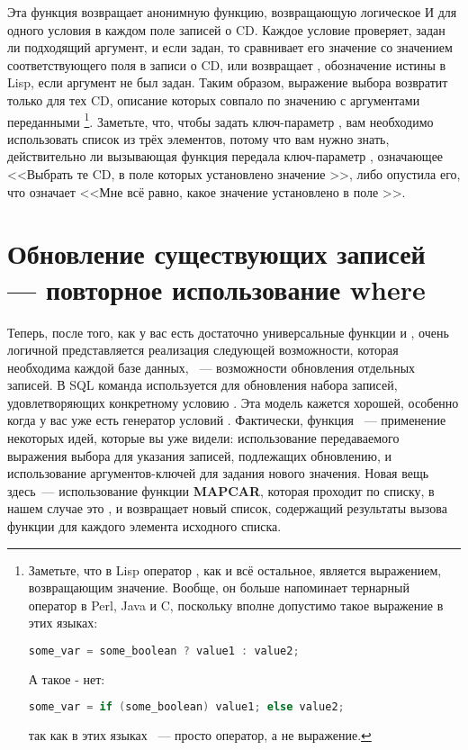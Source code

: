 Эта функция возвращает анонимную функцию, возвращающую логическое И для одного условия в
каждом поле записей о CD. Каждое условие проверяет, задан ли подходящий аргумент, и если
задан, то сравнивает его значение со значением соответствующего поля в записи о CD, или
возвращает , обозначение истины в Lisp, если аргумент не был задан. Таким образом,
выражение выбора возвратит  только для тех CD, описание которых совпало по
значению с аргументами переданными \footnote{Заметьте, что в Lisp оператор
  , как и всё остальное, является выражением, возвращающим значение. Вообще, он
  больше напоминает тернарный оператор  в Perl, Java и C, поскольку вполне
  допустимо такое выражение в этих языках:

\begin{lstlisting}[language=c]
some_var = some_boolean ? value1 : value2;
\end{lstlisting}

А такое - нет:
\begin{lstlisting}[language=C]
some_var = if (some_boolean) value1; else value2;
\end{lstlisting}

так как в этих языках ~--- просто оператор, а не выражение.}. Заметьте, что,
чтобы задать ключ-параметр , вам необходимо использовать список из трёх
элементов, потому что вам нужно знать, действительно ли вызывающая функция передала
ключ-параметр , означающее <<Выбрать те CD, в поле  которых
установлено значение >>, либо опустила его, что означает <<Мне всё равно, какое
значение установлено в поле >>.

\section{Обновление существующих записей — повторное использование where}

Теперь, после того, как у вас есть достаточно универсальные функции  и
, очень логичной представляется реализация следующей возможности, которая
необходима каждой базе данных, ~--- возможности обновления отдельных записей. В SQL команда
 используется для обновления набора записей, удовлетворяющих конкретному
условию . Эта модель кажется хорошей, особенно когда у вас уже есть генератор
условий . Фактически, функция ~--- применение некоторых идей,
которые вы уже видели: использование передаваемого выражения выбора для указания записей,
подлежащих обновлению, и использование аргументов-ключей для задания нового
значения. Новая вещь здесь~--- использование функции \textbf{MAPCAR}, которая проходит по
списку, в нашем случае это , и возвращает новый список, содержащий результаты
вызова функции для каждого элемента исходного списка.


